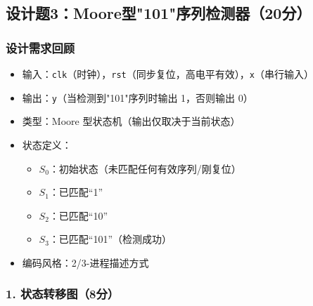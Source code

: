 \subsection{设计题3：Moore型"101"序列检测器（20分）}

\subsubsection*{设计需求回顾}
\begin{itemize}
    \item 输入：\texttt{clk}（时钟），\texttt{rst}（同步复位，高电平有效），\texttt{x}（串行输入）
    \item 输出：\texttt{y}（当检测到"101"序列时输出 1，否则输出 0）
    \item 类型：Moore 型状态机（输出仅取决于当前状态）
    \item 状态定义：
    \begin{itemize}
        \item $S_0$：初始状态（未匹配任何有效序列/刚复位）
        \item $S_1$：已匹配“1”
        \item $S_2$：已匹配“10”
        \item $S_3$：已匹配“101”（检测成功）
    \end{itemize}
    \item 编码风格：2/3-进程描述方式
\end{itemize}

\subsubsection*{1. 状态转移图（8分）}

